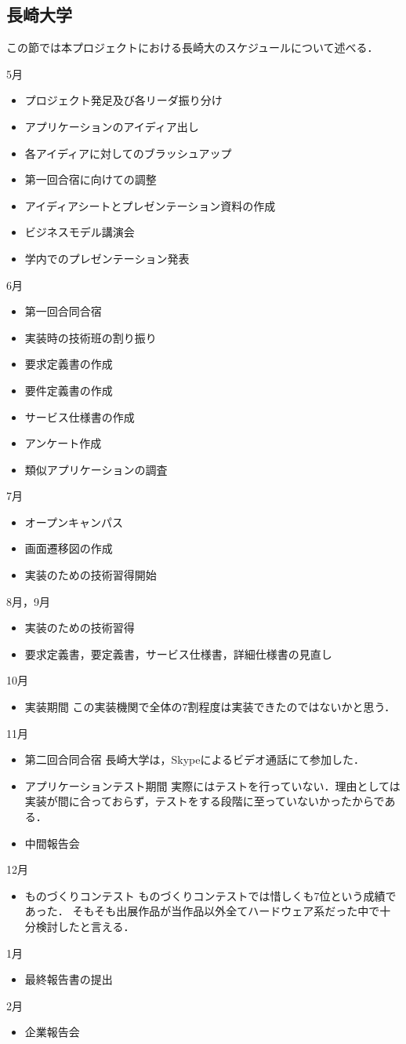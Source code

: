 \subsection{長崎大学}
\par
この節では本プロジェクトにおける長崎大のスケジュールについて述べる．
\par
5月
\begin{itemize}
\item プロジェクト発足及び各リーダ振り分け
\item アプリケーションのアイディア出し
\item 各アイディアに対してのブラッシュアップ
\item 第一回合宿に向けての調整
\item アイディアシートとプレゼンテーション資料の作成
\item ビジネスモデル講演会
\item 学内でのプレゼンテーション発表
\end{itemize}
6月
\begin{itemize}
\item 第一回合同合宿
\item 実装時の技術班の割り振り
\item 要求定義書の作成
\item 要件定義書の作成
\item サービス仕様書の作成
\item アンケート作成
\item 類似アプリケーションの調査
\end{itemize}
7月
\begin{itemize}
\item オープンキャンパス
\item 画面遷移図の作成
\item 実装のための技術習得開始
\end{itemize}
8月，9月
\begin{itemize}
\item 実装のための技術習得
\item 要求定義書，要定義書，サービス仕様書，詳細仕様書の見直し
\end{itemize}
10月
\begin{itemize}
\item 実装期間
この実装機関で全体の7割程度は実装できたのではないかと思う．
\end{itemize}
11月
\begin{itemize}
\item 第二回合同合宿
長崎大学は，Skypeによるビデオ通話にて参加した．
\item アプリケーションテスト期間
実際にはテストを行っていない．理由としては実装が間に合っておらず，テストをする段階に至っていないかったからである．
\item 中間報告会
\end{itemize}
12月
\begin{itemize}
\item ものづくりコンテスト
ものづくりコンテストでは惜しくも7位という成績であった．
そもそも出展作品が当作品以外全てハードウェア系だった中で十分検討したと言える．
\end{itemize}
1月
\begin{itemize}
\item 最終報告書の提出
\end{itemize}
2月
\begin{itemize}
\item 企業報告会
\end{itemize}
